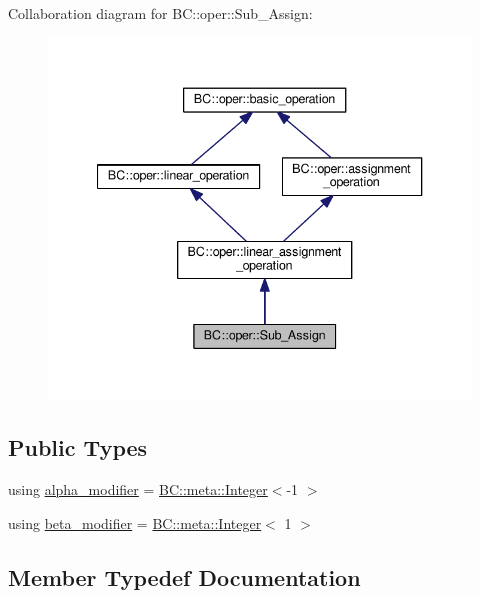 Collaboration diagram for BC\+:\+:oper\+:\+:Sub\+\_\+\+Assign\+:
\nopagebreak
\begin{figure}[H]
\begin{center}
\leavevmode
\includegraphics[width=340pt]{structBC_1_1oper_1_1Sub__Assign__coll__graph}
\end{center}
\end{figure}
\subsection*{Public Types}
\begin{DoxyCompactItemize}
\item 
using \hyperlink{structBC_1_1oper_1_1Sub__Assign_a8ccc3c285ceb7b78ea55adbf49a6d4fa}{alpha\+\_\+modifier} = \hyperlink{structBC_1_1meta_1_1Integer}{B\+C\+::meta\+::\+Integer}$<$-\/1 $>$
\item 
using \hyperlink{structBC_1_1oper_1_1Sub__Assign_a6bb49229c9eba5a10a7c265c0f8715e3}{beta\+\_\+modifier} = \hyperlink{structBC_1_1meta_1_1Integer}{B\+C\+::meta\+::\+Integer}$<$ 1 $>$
\end{DoxyCompactItemize}


\subsection{Member Typedef Documentation}
